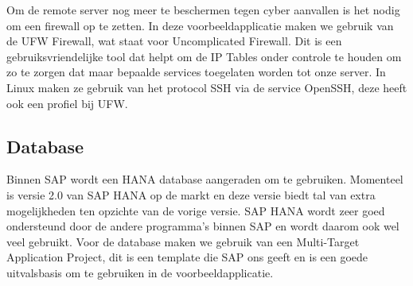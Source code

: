 %        
%        
            
            Om de remote server nog meer te beschermen tegen cyber aanvallen is het nodig om een firewall op te zetten. In deze voorbeeldapplicatie maken we gebruik van de UFW Firewall, wat staat voor Uncomplicated Firewall. Dit is een gebruiksvriendelijke tool dat helpt om de IP Tables onder controle te houden om zo te zorgen dat maar bepaalde services toegelaten worden tot onze server.
            In Linux maken ze gebruik van het protocol SSH via de service OpenSSH, deze heeft ook een profiel bij UFW.
%            
%            
%    
        \subsection{Database}
        Binnen SAP wordt een HANA database aangeraden om te gebruiken. Momenteel is versie 2.0 van SAP HANA op de markt en deze versie biedt tal van extra mogelijkheden ten opzichte van de vorige versie. SAP HANA wordt zeer goed ondersteund door de andere programma's binnen SAP en wordt daarom ook wel veel gebruikt.
        Voor de database maken we gebruik van een Multi-Target Application Project, dit is een template die SAP ons geeft en is een goede uitvalsbasis om te gebruiken in de voorbeeldapplicatie.
        
